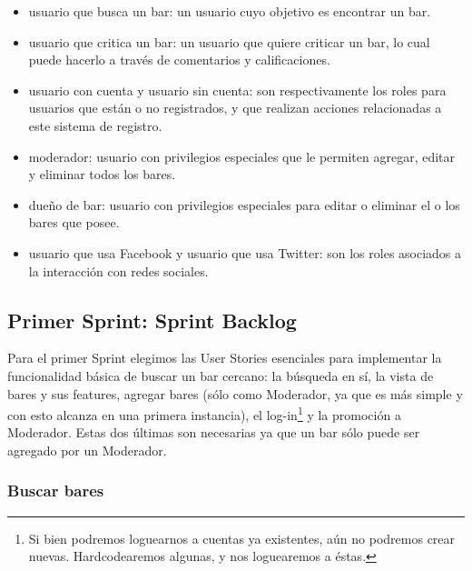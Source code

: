 \begin{itemize}
  \item usuario que busca un bar: un usuario cuyo objetivo es encontrar un bar.
  \item usuario que critica un bar: un usuario que quiere criticar un bar, lo cual puede hacerlo a través de comentarios y calificaciones.
  \item usuario con cuenta y usuario sin cuenta: son respectivamente los roles para usuarios que están o no registrados, y que realizan acciones relacionadas a este sistema de registro.
  \item moderador: usuario con privilegios especiales que le permiten agregar, editar y eliminar todos los bares.
  \item dueño de bar: usuario con privilegios especiales para editar o eliminar el o los bares que posee.
  \item usuario que usa Facebook y usuario que usa Twitter: son los roles asociados a la interacción con redes sociales.
\end{itemize}

\subsection{Primer Sprint: Sprint Backlog}
\par Para el primer Sprint elegimos las User Stories esenciales para implementar la funcionalidad básica de buscar un bar cercano: la búsqueda en sí, la vista de bares y sus features, agregar bares (sólo como Moderador, ya que es más simple y con esto alcanza en una primera instancia), el log-in\footnote{Si bien podremos loguearnos a cuentas ya existentes, aún no podremos crear nuevas. Hardcodearemos algunas, y nos loguearemos a éstas.} y la promoción a Moderador.
Estas dos últimas son necesarias ya que un bar sólo puede ser agregado por un Moderador.

\subsubsection*{Buscar bares}

